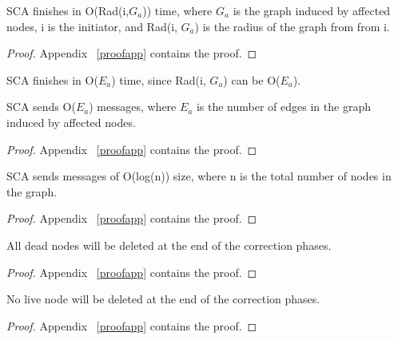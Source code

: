\begin{lemma}
SCA finishes in O(Rad(i,$G_{a}$)) time, where $G_{a}$ is the graph
induced by affected nodes, i is the initiator, and Rad(i, $G_{a}$) is the radius
of the graph from from i.
\label{TimeC}
\end{lemma}
\begin{proof}
Appendix ~\ref{proofapp} contains the proof.
\end{proof}

\begin{observation}
SCA finishes in O($E_a$) time, since Rad(i, $G_{a}$) can be O($E_a$).
\end{observation}
\begin{lemma}
SCA sends O($E_{a}$) messages, where $E_{a}$ is the number of edges
in the graph induced by affected nodes.
\label{CCC}
\end{lemma}
\begin{proof}
Appendix ~\ref{proofapp} contains the proof.
\end{proof}


\begin{lemma}
SCA sends messages of O(log(n)) size, where n is the total number of nodes
in the graph.
\label{MSCP}
\end{lemma}
\begin{proof}
Appendix ~\ref{proofapp} contains the proof.
\end{proof}


\begin{theorem}
All dead nodes will be deleted at the end of the correction phases.
\label{pro:livenesss}
\end{theorem}
\begin{proof}
Appendix ~\ref{proofapp} contains the proof.
\end{proof}

\begin{theorem}
No live node will be deleted at the end of the correction phases.
\label{pro:safetys}
\end{theorem}

\begin{proof}
Appendix ~\ref{proofapp} contains the proof.


\end{proof}


